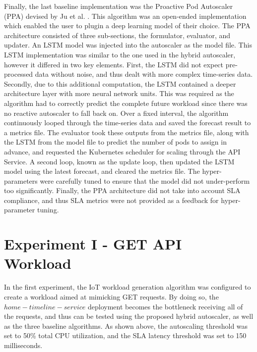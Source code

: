 Finally, the last baseline implementation was the Proactive Pod Autoscaler (PPA) devised by Ju et al. \cite{ju2021proactive}. This algorithm was an open-ended implementation which enabled the user to plugin a deep learning model of their choice. The PPA architecture consisted of three sub-sections, the formulator, evaluator, and updater. An LSTM model was injected into the autoscaler as the model file. This LSTM implementation was similar to the one used in the hybrid autoscaler, however it differed in two key elements. First, the LSTM did not expect pre-processed data without noise, and thus dealt with more complex time-series data. Secondly, due to this additional computation, the LSTM contained a deeper architecture layer with more neural network units. This was required as the algorithm had to correctly predict the complete future workload since there was no reactive autoscaler to fall back on. Over a fixed interval, the algorithm continuously looped through the time-series data and saved the forecast result to a metrics file. The evaluator took these outputs from the metrics file, along with the LSTM from the model file to predict the number of pods to assign in advance, and requested the Kubernetes scheduler for scaling through the API Service. A second loop, known as the update loop, then updated the LSTM model using the latest forecast, and cleared the metrics file. The hyper-parameters were carefully tuned to ensure that the model did not under-perform too significantly. Finally, the PPA architecture did not take into account SLA compliance, and thus SLA metrics were not provided as a feedback for hyper-parameter tuning.\par


\section{Experiment I - GET API Workload}
\label{sec:ch5-exp1-get-api}

In the first experiment, the IoT workload generation algorithm was configured to create a workload aimed at mimicking GET requests. By doing so, the $home-timeline-service$ deployment becomes the bottleneck receiving all of the requests, and thus can be tested using the proposed hybrid autoscaler, as well as the three baseline algorithms. As shown above, the autoscaling threshold was set to 50\% total CPU utilization, and the SLA latency threshold was set to 150 milliseconds.\par

